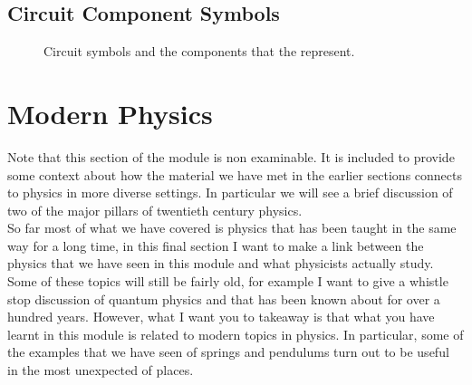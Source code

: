 \documentclass[a4paper,12pt]{book}
\begin{document}
\section{Circuit Component Symbols}
\begin{figure}[ht]
    \centering
    \caption{Circuit symbols and the components that the represent.}
    \label{fig: circuit components}
\end{figure}


\chapter{Modern Physics}
Note that this section of the module is non examinable. It is included to provide some context about how the material we have met in the earlier sections connects to physics in more diverse settings. In particular we will see a brief discussion of two of the major pillars of twentieth century physics.\\

So far most of what we have covered is physics that has been taught in the same way for a long time, in this final section I want to make a link between the physics that we have seen in this module and what physicists actually study. Some of these topics will still be fairly old, for example I want to give a whistle stop discussion of quantum physics and that has been known about for over a hundred years. However, what I want you to takeaway is that what you have learnt in this module is related to modern topics in physics. In particular, some of the examples that we have seen of springs and pendulums turn out to be useful in the most unexpected of places.\\
\end{document}
